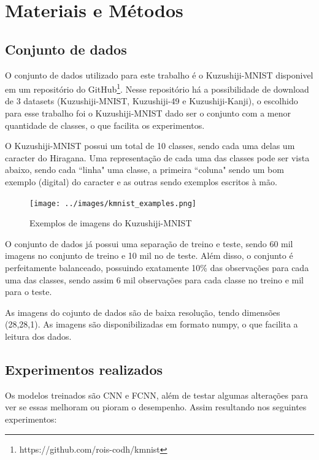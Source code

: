 \documentclass[12pt]{article}
\begin{document}
\section{Materiais e Métodos} 

\subsection{Conjunto de dados}

O conjunto de dados utilizado para este trabalho é o Kuzushiji-MNIST \cite{DBLP:journals/corr/abs-1812-01718} disponivel em um repositório do GitHub\footnote{https://github.com/rois-codh/kmnist}. Nesse repositório há a possibilidade de download de 3 datasets (Kuzushiji-MNIST, Kuzushiji-49 e Kuzushiji-Kanji), o escolhido para esse trabalho foi o Kuzushiji-MNIST dado ser o conjunto com a menor quantidade de classes, o que facilita os experimentos. 

O Kuzushiji-MNIST possui um total de 10 classes, sendo cada uma delas um caracter do Hiragana. Uma representação de cada uma das classes pode ser vista abaixo, sendo cada ``linha" uma classe, a primeira ``coluna" sendo um bom exemplo (digital) do caracter e as outras sendo exemplos escritos à mão.

\begin{figure}[ht]
  \centering
  \texttt{[image: ../images/kmnist\_examples.png]}
  \caption{Exemplos de imagens do Kuzushiji-MNIST}
  \label{fig:kmnist-examples}
\end{figure}

O conjunto de dados já possui uma separação de treino e teste, sendo 60 mil imagens no conjunto de treino e 10 mil no de teste. Além disso, o conjunto é perfeitamente balanceado, possuindo exatamente 10\% das observações para cada uma das classes, sendo assim 6 mil observações para cada classe no treino e mil para o teste.

As imagens do cojunto de dados são de baixa resolução, tendo dimensões (28,28,1). As imagens são disponibilizadas em formato numpy, o que facilita a leitura dos dados.


\subsection{Experimentos realizados}

Os modelos treinados são CNN  e FCNN, além de testar algumas alterações para ver se essas melhoram ou pioram o desempenho. Assim resultando nos seguintes experimentos:
\end{document}
